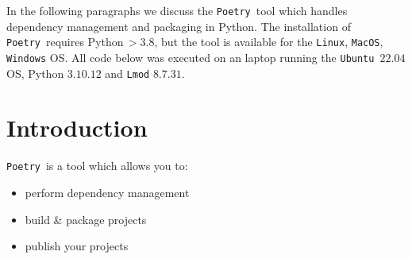 \documentclass[10pt]{article}
\newcommand{\POETRY}{\texttt{Poetry}}
\begin{document}
\title{}
\author{Wim R.M. Cardoen \\ Email: \$(prefix)[at]gmail[dot]com \\ where \\ prefix='wcardoen' }
\date{\today}
\maketitle
\thispagestyle{empty}
\pagestyle{plain}
\setcounter{page}{1}
\renewcommand \thesection{\Roman{section}} 

In the following paragraphs we discuss the \POETRY\ tool \cite{POETRY:2023} which handles
dependency management and packaging in Python. The installation of \POETRY\ requires Python\,$>3.8$, 
but the tool is available for the \texttt{Linux}, \texttt{MacOS}, \texttt{Windows} OS.
All code below was executed on an laptop running the \texttt{Ubuntu $22.04$} OS, Python $3.10.12$ 
and \texttt{Lmod} $8.7.31$.

\section*{Introduction}
\POETRY\ is a tool which allows you to:
\begin{itemize}
	\item perform dependency management
        \item build \& package projects
        \item publish your projects		
\end{itemize}		
\end{document}
